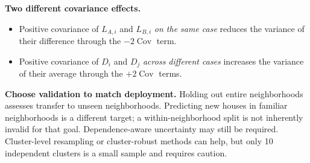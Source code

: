 \documentclass[11pt,letterpaper]{article}
\newcommand{\Cov}{\operatorname{Cov}}
\theoremstyle{definition}
\theoremstyle{remark}
\numberwithin{equation}{section}
\begin{document}
\textbf{Two different covariance effects.}
\begin{itemize}
\item Positive covariance of $L_{A,i}$ and $L_{B,i}$ \emph{on the same case}
reduces the variance of their difference through the $-2\Cov$ term.
\item Positive covariance of $D_i$ and $D_j$ \emph{across different cases}
increases the variance of their average through the $+2\Cov$ terms.
\end{itemize}
\textbf{Choose validation to match deployment.} Holding out entire neighborhoods
assesses transfer to unseen neighborhoods. Predicting new houses in familiar
neighborhoods is a different target; a within-neighborhood split is not inherently
invalid for that goal. Dependence-aware uncertainty may still be required.
Cluster-level resampling or cluster-robust methods can help, but only 10 independent
clusters is a small sample and requires caution.
\newpage
\end{document}
